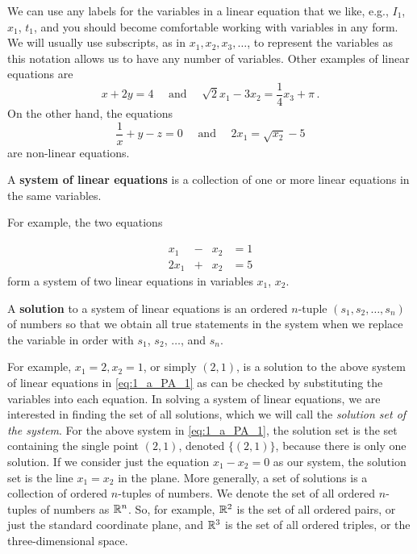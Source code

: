 We can use any labels for the variables in a linear equation that we like, e.g., $I_1$, $x_1$, $t_1$, and you should become comfortable working with variables in any form. We will usually use subscripts, as in $x_1, x_2, x_3, \ldots$, to represent the variables as this notation allows us to have any number of variables. Other examples of linear equations are 
\[ x+2y=4 \quad \text{ and } \quad \sqrt{2}x_1-3x_2=\frac{1}{4}x_3+\pi \, .\]
On the other hand, the equations
\[\frac{1}{x}+y-z=0 \quad \text{ and } \quad 2x_1=\sqrt{x_2}-5 \]
are non-linear equations. 

\begin{definition} A \textbf{system of linear equations} is a collection of one or more linear equations in the same variables. 
\end{definition}

For example, the two equations 

\begin{equation} \label{eq:1_a_PA_1}
\begin{alignedat}{4}
x_1 	&{}-{}	&x_2	&= 1  \\ 
2x_1 	&{}+{} 	&x_2	&= 5 
\end{alignedat}
\end{equation}
form a system of two linear equations in variables $x_1$, $x_2$.

\begin{definition} A \textbf{solution} to a system of linear equations is an ordered $n$-tuple $(s_1, s_2, \ldots, s_n)$ of numbers so that we obtain all true statements in the system when we replace the variable in order with $s_1$, $s_2$, $\ldots$, and  $s_n$. 
\end{definition}

For example, $x_1=2, x_2=1$, or simply $(2,1)$, is a solution to the above system of linear equations in \eqref{eq:1_a_PA_1} as can be checked by substituting the variables into each equation. In solving a system of linear equations, we are interested in finding the set of all solutions, which we will call the \emph{solution set of the system}. For the above system in \eqref{eq:1_a_PA_1}, the solution set is the set containing the single point $(2,1)$, denoted $\{(2,1)\}$, because there is only one solution. If we consider just the equation $x_1-x_2=0$ as our system, the solution set is the line $x_1=x_2$ in the plane. More generally, a set of solutions is a collection of ordered $n$-tuples of numbers. We denote the set of all ordered $n$-tuples of numbers as $\mathbb{R}^n$. So, for example, $\mathbb{R}^2$ is the set of all ordered pairs, or just the standard coordinate plane, and $\mathbb{R}^3$ is the set of all ordered triples, or the three-dimensional space. 


